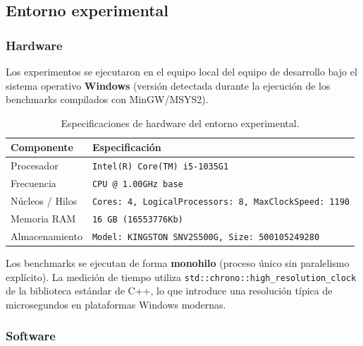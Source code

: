 
\subsection{Entorno experimental}

\subsubsection{Hardware}

Los experimentos se ejecutaron en el equipo local del equipo de desarrollo
bajo el sistema operativo \textbf{Windows} (versión detectada durante la
ejecución de los benchmarks compilados con MinGW/MSYS2).

\begin{table}[t]
  \centering
  \caption{Especificaciones de hardware del entorno experimental.}
  \label{tab:hardware}
  \begin{tabular}{ll}
    \toprule
    \textbf{Componente} & \textbf{Especificación} \\
    \midrule
    Procesador     & \texttt{Intel(R) Core(TM) i5-1035G1} \\
    Frecuencia     & \texttt{CPU @ 1.00GHz base} \\
    Núcleos / Hilos & \texttt{Cores: 4, LogicalProcessors: 8, MaxClockSpeed: 1190} \\
    Memoria RAM    & \texttt{16\,GB (16553776Kb)} \\
    Almacenamiento & \texttt{Model: KINGSTON SNV2S500G, Size: 500105249280} \\
    \bottomrule
  \end{tabular}
\end{table}

Los benchmarks se ejecutan de forma \textbf{monohilo} (proceso único sin
paralelismo explícito). La medición de tiempo utiliza
\lstinline{std::chrono::high_resolution_clock} de la biblioteca estándar de
C++, lo que introduce una resolución típica de microsegundos en plataformas
Windows modernas.

\subsubsection{Software}


